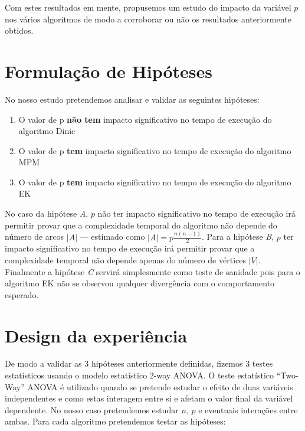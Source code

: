 \documentclass{uofa-eng-assignment}
\begin{document}
Com estes resultados em mente, propusemos um estudo do impacto da variável $p$ nos vários algoritmos de modo a corroborar ou não os resultados anteriormente obtidos.

\section{Formulação de Hipóteses}
\label{sec:formulacao-hipoteses}

No nosso estudo pretendemos analisar e validar as seguintes hipóteses:

\begin{enumerate}[label=\emph{\Alph*} -]
\item O valor de p \textbf{não tem} impacto significativo no tempo de execução do algoritmo Dinic
\item O valor de p \textbf{tem} impacto significativo no tempo de execução do algoritmo MPM
\item O valor de p \textbf{tem} impacto significativo no tempo de execução do algoritmo EK
\end{enumerate}

No caso da hipótese \emph{A}, $p$ não ter impacto significativo no tempo de execução irá permitir provar que a complexidade temporal do algoritmo não depende do número de arcos $|A|$ --- estimado como $|A|=p\frac{n(n-1)}{2}$. Para a hipótese \emph{B}, $p$ ter impacto significativo no tempo de execução irá permitir provar que a complexidade temporal não depende apenas do número de vértices $|V|$. Finalmente a hipótese \emph{C} servirá simplesmente como teste de sanidade pois para o algoritmo EK não se observou qualquer divergência com o comportamento esperado.

\section{Design da experiência}

De modo a validar as 3 hipóteses anteriormente definidas, fizemos 3 testes estatísticos usando o modelo estatístico 2-way ANOVA. O teste estatístico “Two-Way” ANOVA é utilizado quando se pretende estudar o efeito de duas variáveis independentes e como estas interagem entre si e afetam o valor final da variável dependente. No nosso caso pretendemos estudar $n$, $p$ e eventuais interações entre ambas. Para cada algoritmo pretendemos testar as hipóteses:
\end{document}
